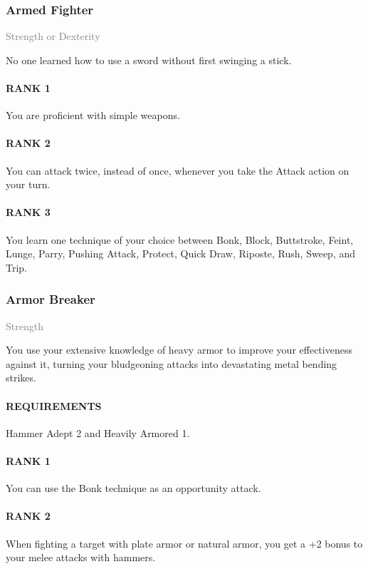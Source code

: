 \subsubsection{Armed Fighter} \label{tal::armedfighter}
\small{\textcolor{gray}{Strength or Dexterity}}

\normalsize
No one learned how to use a sword without first swinging a stick.
\paragraph{RANK 1} You are proficient with simple weapons.
\paragraph{RANK 2} You can attack twice, instead of once, whenever you take the Attack action on your turn.
\paragraph{RANK 3} You learn one technique of your choice between Bonk, Block, Buttstroke, Feint, Lunge, Parry, Pushing Attack, Protect, Quick Draw, Riposte, Rush, Sweep, and Trip.

\subsubsection{Armor Breaker} \label{tal::armorbreaker}
\small{\textcolor{gray}{Strength}}

\normalsize
You use your extensive knowledge of heavy armor to improve your effectiveness against it, turning your bludgeoning attacks into devastating metal bending strikes.
\paragraph{REQUIREMENTS} Hammer Adept 2 and Heavily Armored 1.
\paragraph{RANK 1} You can use the Bonk technique as an opportunity attack.
\paragraph{RANK 2} When fighting a target with plate armor or natural armor, you get a +2 bonus to your melee attacks with hammers.
